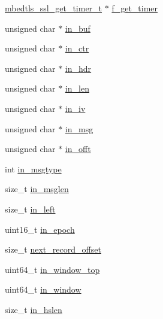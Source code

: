 \begin{DoxyCompactItemize}
\item 
\mbox{\hyperlink{ssl_8h_adea005600b532d788c05e9d01b42895b}{mbedtls\+\_\+ssl\+\_\+get\+\_\+timer\+\_\+t}} $\ast$ \mbox{\hyperlink{structmbedtls__ssl__context_a4c66906a1b5e82d84f67db66a695fa2c}{f\+\_\+get\+\_\+timer}}
\item 
unsigned char $\ast$ \mbox{\hyperlink{structmbedtls__ssl__context_a81a9c513f47631c198d74cbeb4d1999f}{in\+\_\+buf}}
\item 
unsigned char $\ast$ \mbox{\hyperlink{structmbedtls__ssl__context_ab53517e77417e69419985902a528cc6a}{in\+\_\+ctr}}
\item 
unsigned char $\ast$ \mbox{\hyperlink{structmbedtls__ssl__context_ac1d0542cf430db2fb4b2855afc29fd5e}{in\+\_\+hdr}}
\item 
unsigned char $\ast$ \mbox{\hyperlink{structmbedtls__ssl__context_af7235ac32f8a336a7636c63af6ef2127}{in\+\_\+len}}
\item 
unsigned char $\ast$ \mbox{\hyperlink{structmbedtls__ssl__context_a77217f5c44f1ad2518a873030278628d}{in\+\_\+iv}}
\item 
unsigned char $\ast$ \mbox{\hyperlink{structmbedtls__ssl__context_a9c55d8cac2040048e56a6a2a694375c8}{in\+\_\+msg}}
\item 
unsigned char $\ast$ \mbox{\hyperlink{structmbedtls__ssl__context_af07148a2eb35b01d63b3f6d9b59e58df}{in\+\_\+offt}}
\item 
int \mbox{\hyperlink{structmbedtls__ssl__context_aa2283450c4e546808af09c943f115780}{in\+\_\+msgtype}}
\item 
size\+\_\+t \mbox{\hyperlink{structmbedtls__ssl__context_adfee31e1e5269ab17d1df707025df30a}{in\+\_\+msglen}}
\item 
size\+\_\+t \mbox{\hyperlink{structmbedtls__ssl__context_ae989f555c14b7c6286d7a4616860cb24}{in\+\_\+left}}
\item 
uint16\+\_\+t \mbox{\hyperlink{structmbedtls__ssl__context_ae6d4405b5829fb244a0d6a4ad1e20d91}{in\+\_\+epoch}}
\item 
size\+\_\+t \mbox{\hyperlink{structmbedtls__ssl__context_a97191c6503f07466475793478e195803}{next\+\_\+record\+\_\+offset}}
\item 
uint64\+\_\+t \mbox{\hyperlink{structmbedtls__ssl__context_a988404cded6bf548fa92b5800d20eb09}{in\+\_\+window\+\_\+top}}
\item 
uint64\+\_\+t \mbox{\hyperlink{structmbedtls__ssl__context_a0728b2d8fb513ca83853eb1a24bbdf38}{in\+\_\+window}}
\item 
size\+\_\+t \mbox{\hyperlink{structmbedtls__ssl__context_a8fa1f7b5ff4c594a3880e256a4044399}{in\+\_\+hslen}}

\end{DoxyCompactItemize}
